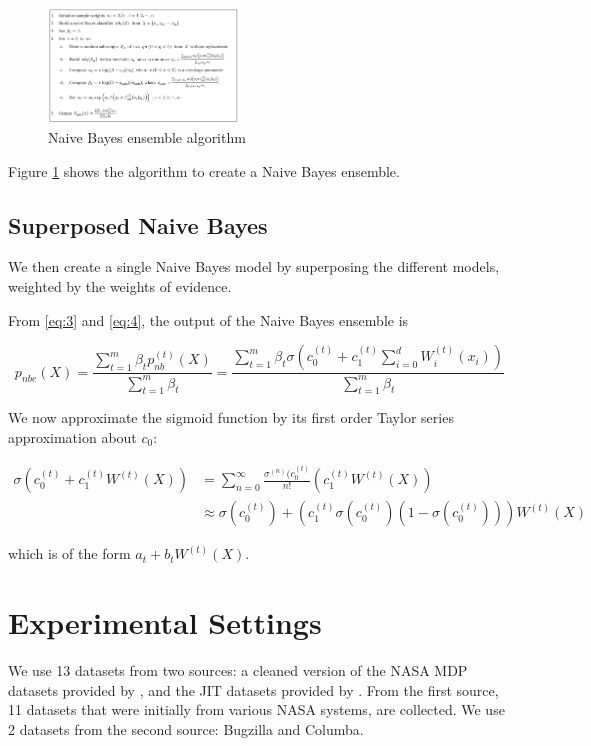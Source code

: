 \documentclass[sigconf]{acmart}
\begin{document}
\begin{figure}
\includegraphics[width=0.45\textwidth]{fig1.png}
\caption{Naive Bayes ensemble algorithm}
\label{fig:1}
\end{figure}

Figure \ref{fig:1} shows the algorithm to create a Naive Bayes ensemble.

\subsection{Superposed Naive Bayes}
We then create a single Naive Bayes model by superposing the different models, weighted by the weights of evidence. 

From \eqref{eq:3} and \eqref{eq:4}, the output of the Naive Bayes ensemble is

\begin{equation}
p_{nbe}(X) = \frac{\sum\limits_{t=1}^m \beta_t p_{nb}^{(t)}(X)}{\sum\limits_{t=1}^m \beta_t} = \frac{\sum\limits_{t=1}^m \beta_t \sigma\left(c_0^{(t)} + c_1^{(t)} \sum\limits_{i=0}^d W_i^{(t)}(x_i)\right)}{\sum\limits_{t=1}^m \beta_t}
\label{eq:5}
\end{equation}

We now approximate the sigmoid function by its first order Taylor series approximation about $c_0$:

\begin{align}
	\sigma\left(c_0^{(t)} + c_1^{(t)} W^{(t)}(X)\right) &= \sum\limits_{n=0}^\infty \frac{\sigma^{(n)}(c_0^{(t)}}{n!}\left(c_1^{(t)}W^{(t)}(X)\right) \nonumber \\ &\approx \sigma(c_0^{(t)}) + \left( c_1^{(t)} \sigma(c_0^{(t)}) \left( 1 - \sigma(c_0^{(t)}) \right) \right) W^{(t)}(X)
\end{align}

which is of the form $a_t + b_t W^{(t)}(X)$.

\section{Experimental Settings}
We use 13 datasets from two sources: a cleaned version of the NASA MDP datasets provided by \cite{shepperd2013data}, and the JIT datasets provided by \cite{kamei2012large}. From the first source, 11 datasets that were initially from various NASA systems, are collected. We use 2 datasets from the second source: Bugzilla and Columba.
\end{document}
